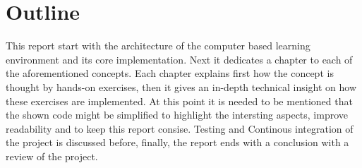 \section{Outline}

This report start with the architecture of the computer based learning environment and its core implementation. Next it dedicates a chapter to each of the aforementioned concepts. Each chapter explains first how the concept is thought by hands-on exercises, then it gives an in-depth technical insight on how these exercises are implemented. At this point it is needed to be mentioned that the shown code might be simplified to highlight the intersting aspects, improve readability and to keep this report consise. Testing and Continous integration of the project is discussed before, finally, the report ends with a conclusion with a review of the project.
